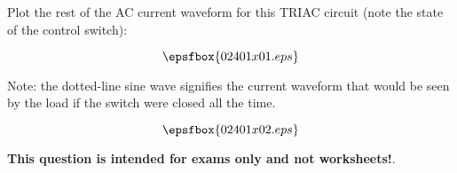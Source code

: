 

Plot the rest of the AC current waveform for this TRIAC circuit (note the state of the control switch):

$$\epsfbox{02401x01.eps}$$

Note: the dotted-line sine wave signifies the current waveform that would be seen by the load if the switch were closed all the time.







$$\epsfbox{02401x02.eps}$$







{\bf This question is intended for exams only and not worksheets!}.





